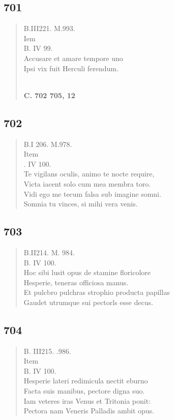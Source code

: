 \documentclass[11pt, a4paper]{report}
\begin{document}
            \subsection*{701}
      \begin{verse}
      B.III221. M.993. \\ Iem \\ B. IV 99. \\ Accusare et amare tempore uno \\ Ipsi vix fuit Herculi ferendum. \\ 
        ﻿\pagebreak 
    \begin{center} \textbf{C. 702 705, 12} \end{center} \marginpar{[172]} 
      \end{verse}
  
            \subsection*{702}
      \begin{verse}
      B.I 206. M.978. \\ Item \\ . IV 100. \\ Te vigilans oculis, animo te nocte require, \\ Victa iacent solo cum mea membra toro. \\ Vidi ego me tecum falsa sub imagine somni. \\ Somnia tu vinces, si mihi vera venis. \\ 
      \end{verse}
  
            \subsection*{703}
      \begin{verse}
      B.II214. M. 984. \\ B. IV 100. \\ Hoc sibi lusit opus de stamine floricolore \\ Hesperie, teneras officiosa manus. \\ Et pulcbro pulchras strophio producta papillas \\ Gaudet utrumque sui pectorls esse decus. \\ 
      \end{verse}
  
            \subsection*{704}
      \begin{verse}
      B. III215. .986. \\  \lbrack Item \rbrack  \\ B. IV 100. \\ Hesperie lateri redimicula nectit eburno \\ Facta suis manibus, pectore digna suo. \\ Iam veteres iras Venus et Tritonia ponit: \\ Pectora nam Veneris Palladis ambit opus. \\ 
      \end{verse}
  
\end{document}
